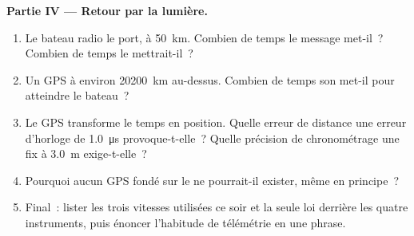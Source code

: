 \begin{problem}[{Problème du week-end --- lire les signaux du monde~:
une loi, $d = v\,t$, localise un orage, cartographie un fond, compte
un battement de cœur et tire au clair comment fonctionne le GPS}]
\medskip
\noindent\textbf{Partie IV --- Retour par la lumière.}
\begin{enumerate}[resume]
  \item Le bateau radio le port, à \qty{50}{km}. Combien de temps le
        message met-il~? Combien de temps le 
        mettrait-il~?
  \item Un  GPS 
        à environ \qty{20200}{km} au-dessus. Combien de temps son
         met-il pour atteindre le bateau~?
  \item Le GPS transforme le temps en position. Quelle erreur de
        distance une erreur d'horloge de \qty{1.0}{\micro s}
        provoque-t-elle~? Quelle précision de chronométrage une fix à
        \qty{3.0}{m} exige-t-elle~?
  \item Pourquoi aucun GPS fondé sur le  ne pourrait-il exister, même
        en principe~?
  \item Final~: lister les trois vitesses utilisées ce soir et la seule
        loi derrière les quatre instruments, puis énoncer l'habitude de
        télémétrie en une phrase.
\end{enumerate}
\end{problem}

